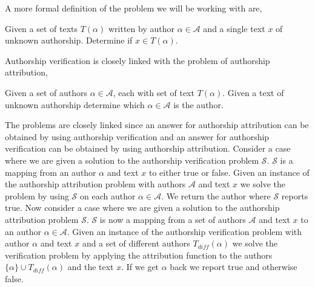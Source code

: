 
A more formal definition of the problem we will be working with are,

\begin{definition}

    Given a set of texts $T(\alpha)$ written by author $\alpha \in \mathcal{A}$
    and a single text $x$ of unknown authorship. Determine if $x \in T(\alpha)$.

\end{definition}

Authorship verification is closely linked with the problem of authorship
attribution,

\begin{definition}

    Given a set of authors $\alpha \in \mathcal{A}$, each with set of text
    $T(\alpha)$. Given a text of unknown authorship determine which $\alpha \in
    \mathcal{A}$ is the author.

\end{definition}

The problems are closely linked since an answer for authorship attribution
can be obtained by using authorship verification and an answer for authorship
verification can be obtained by using authorship attribution. Consider a
case where we are given a solution to the authorship verification problem
$\mathcal{S}$. $\mathcal{S}$ is a mapping from an author $\alpha$ and text
$x$ to either true or false. Given an instance of the authorship attribution
problem with authors $\mathcal{A}$ and text $x$ we solve the problem by using
$\mathcal{S}$ on each author $\alpha \in \mathcal{A}$. We return the author
where $\mathcal{S}$ reports true. Now consider a case where we are given a
solution to the authorship attribution problem $\mathcal{S}$. $\mathcal{S}$ is
now a mapping from a set of authors $\mathcal{A}$ and text $x$ to an author
$\alpha \in \mathcal{A}$. Given an instance of the authorship verification
problem with author $\alpha$ and text $x$ and a set of different authors
$T_{diff}(\alpha)$ we solve the verification problem by applying the attribution
function to the authors $\{\alpha\} \cup T_{diff}(\alpha)$ and the text $x$. If
we get $\alpha$ back we report true and otherwise false.
